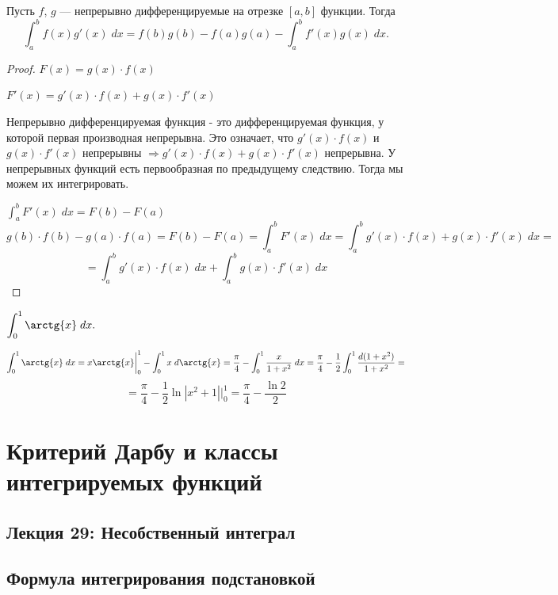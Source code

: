     \begin{theorem}
    	Пусть $f$, $g$ — непрерывно дифференцируемые на отрезке $[a, b]$ функции. Тогда
    	\[ \int_a^b f(x)g'(x) \; dx = f(b)g(b) - f(a)g(a) - \int_a^b f'(x)g(x) \; dx. \]
    \end{theorem}
    
    \begin{proof}
    	$F(x) = g(x) \cdot f(x)$
    	
    	$F'(x) = g'(x) \cdot f(x) + g(x) \cdot f'(x)$
    	
    	Непрерывно дифференцируемая функция - это дифференцируемая функция, у которой первая производная непрерывна. Это означает, что $g'(x) \cdot f(x)$ и $g(x) \cdot f'(x)$ непрерывны $\Rightarrow g'(x) \cdot f(x) + g(x) \cdot f'(x)$ непрерывна. У непрерывных функций есть первообразная по предыдущему следствию. Тогда мы можем их интегрировать.
    	
    	$\int_a^b F'(x) \; dx = F(b) - F(a)$    	
    	\[ g(b) \cdot f(b) - g(a) \cdot f(a) = F(b) - F(a) = \int_a^b F'(x) \; dx = \int_a^b g'(x) \cdot f(x) + g(x) \cdot f'(x) \; dx = \]
    	\[ = \int_a^b g'(x) \cdot f(x) \; dx + \int_a^b g(x) \cdot f'(x) \; dx \]
    \end{proof}
    
    \begin{example}
    	$\displaystyle\int_0^1 \arctg{x} \; dx.$
    \end{example}
    \[ \displaystyle\int_0^1 \arctg{x} \; dx = x\arctg{x}\bigg|_0^1 - \int_0^1 x \; d\arctg{x} = \frac{\pi}{4} - \int_0^1 \frac{x}{1 + x^2} \; dx = \frac{\pi}{4} - \frac{1}{2} \int_0^1 \frac{d(1 + x^2)}{1 + x^2} = \]
    \[ = \frac{\pi}{4} - \frac{1}{2} \ln{|x^2 + 1|} \bigg|_0^1 = \frac{\pi}{4} - \frac{\ln{2}}{2} \]
    
    \chapter{Критерий Дарбу и классы интегрируемых функций}
    
    \section*{Лекция 29: Несобственный интеграл}
    
    \section{Формула интегрирования подстановкой}
    
